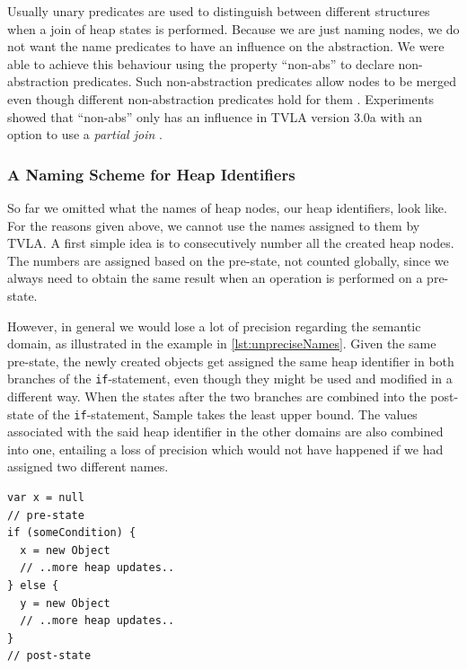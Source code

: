 \documentclass[11pt,a4paper,english]{article}
\begin{document}
Usually unary predicates are used to distinguish between different structures
when a join of heap states is performed. Because we are just naming nodes, we do
not want the name predicates to have an influence on the abstraction. We were
able to achieve this behaviour using the property ``non-abs'' to declare
non-abstraction predicates. Such non-abstraction predicates allow nodes to be
merged even though different non-abstraction predicates hold for them
\cite{lev2000tvla}. Experiments showed that ``non-abs'' only has an influence in
TVLA version 3.0a with an option to use a \textit{partial join}
\cite{lev2006abstraction,manevich2004partially}.   

\subsubsection{A Naming Scheme for Heap Identifiers}
So far we omitted what the names of heap nodes, our heap identifiers, look like.
For the reasons given above, we cannot use the names assigned to them by TVLA. A
first simple idea is to consecutively number all the created heap nodes. The
numbers are assigned based on the pre-state, not counted globally, since we
always need to obtain the same result when an operation is performed on a
pre-state.

However, in general we would lose a lot of precision regarding the semantic
domain, as illustrated in the example in \autoref{lst:unpreciseNames}. Given the
same pre-state, the newly created objects get assigned the same heap identifier in
both branches of the \texttt{if}-statement, even though they might be used and
modified in a different way. When the states after the two branches are combined
into the post-state of the \texttt{if}-statement, Sample takes the least
upper bound. The values associated with the said heap identifier in the other
domains are also combined into one, entailing a loss of precision which would
not have happened if we had assigned two different names.
\begin{lstlisting}[float,caption={Imprecision of consecutive names},label=lst:unpreciseNames]
var x = null
// pre-state
if (someCondition) {
  x = new Object
  // ..more heap updates..
} else {
  y = new Object
  // ..more heap updates..
}
// post-state
\end{lstlisting}

\newcommand{\ProgramPoint}{\ensuremath{\mathit{ProgramPoint}}}
\newcommand{\PPC}{\ensuremath{\mathit{PPC}}}
\newcommand{\HeapID}{\ensuremath{\mathit{HeapID}}}
\end{document}

